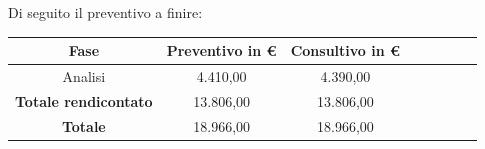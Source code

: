			Di seguito il preventivo a finire:
			\begin{longtable}{|c|c|c|c|c|c|c|c}
				\hline
				\rowcolor{lighter-grayer}
				\textbf{Fase} & \textbf{Preventivo in €} & \textbf{Consultivo in €} \\
				\hline
				\endfirsthead
				
				\hline
				Analisi & 4.410,00 & 4.390,00\\
				\hline
				\hline
				\textbf{Totale rendicontato} & 13.806,00 & 13.806,00\\
				\hline
				\hline
				\textbf{Totale} & 18.966,00 & 18.966,00\\
				\hline
			\end{longtable}
			
			
			